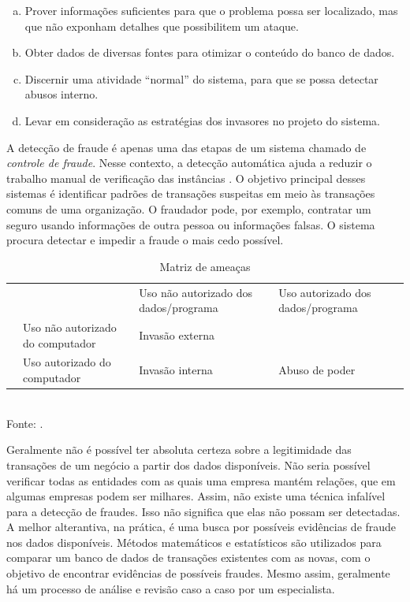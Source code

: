 \begin{enumerate}[a)]
    \item Prover informações suficientes para que o problema possa ser localizado, mas que não exponham detalhes que possibilitem um ataque.
    \item Obter dados de diversas fontes para otimizar o conteúdo do banco de dados.
    \item Discernir uma atividade ``normal'' do sistema, para que se possa detectar abusos interno.
    \item Levar em consideração as estratégias dos invasores no projeto do sistema.
\end{enumerate}

A detecção de fraude é apenas uma das etapas de um sistema chamado de \emph{controle de fraude}. Nesse contexto, a detecção automática ajuda a reduzir o trabalho manual de verificação das instâncias \cite{Phua2010}. O objetivo principal desses sistemas é identificar padrões de transações suspeitas em meio às transações comuns de uma organização. O fraudador pode, por exemplo, contratar um seguro usando informações de outra pessoa ou informações falsas. O sistema procura detectar e impedir a fraude o mais cedo possível.

\renewcommand{\arraystretch}{1.5}
\begin{table}[h!]
    \caption{Matriz de ameaças}
    \label{fraud:and}
    \centering
    \begin{tabular}{c p{4cm}|>{\centering\arraybackslash}p{4cm}|>{\centering\arraybackslash}p{4cm}|}
        \cline{3-4}
        & & Uso não autorizado dos dados/programa & Uso autorizado dos dados/programa \\
        \hhline{~---}
        \multicolumn{0}{c|}{} & Uso não autorizado do computador & Invasão externa & \cellcolor{gray!90} \\
        \cline{2-4}
        \multicolumn{0}{c|}{} & Uso autorizado do computador & Invasão interna & Abuso de poder \\
        \cline{2-4}
    \end{tabular}
    \\ Fonte: \cite{Anderson1972}.
\end{table}

Geralmente não é possível ter absoluta certeza sobre a legitimidade das transações de um negócio a partir dos dados disponíveis. Não seria possível verificar todas as entidades com as quais uma empresa mantém relações, que em algumas empresas podem ser milhares. Assim, não existe uma técnica infalível para a detecção de fraudes. Isso não significa que elas não possam ser detectadas. A melhor alterantiva, na prática, é uma busca por possíveis evidências de fraude nos dados disponíveis. Métodos matemáticos e estatísticos são utilizados para comparar um banco de dados de transações existentes com as novas, com o objetivo de encontrar evidências de possíveis fraudes. Mesmo assim, geralmente há um processo de análise e revisão caso a caso por um especialista.

